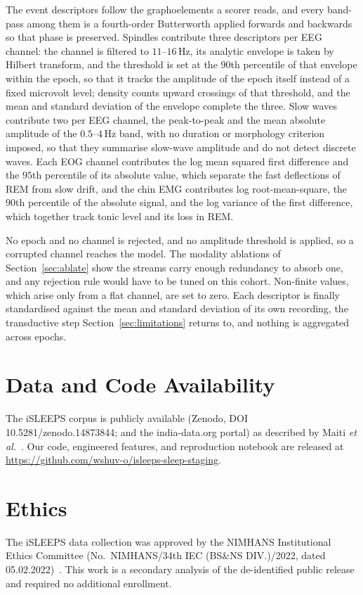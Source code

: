\documentclass{ieeeaccess}
\begin{document}
The event descriptors follow the graphoelements a scorer reads, and every band-pass
among them is a fourth-order Butterworth applied forwards and backwards so that
phase is preserved. Spindles contribute three descriptors per EEG channel: the
channel is filtered to $11$--$16$\,Hz, its analytic envelope is taken by Hilbert
transform, and the threshold is set at the $90$th percentile of that envelope within
the epoch, so that it tracks the amplitude of the epoch itself instead of a fixed
microvolt level; density counts upward crossings of that threshold, and the mean and
standard deviation of the envelope complete the three. Slow waves contribute two per
EEG channel, the peak-to-peak and the mean absolute amplitude of the $0.5$--$4$\,Hz
band, with no duration or morphology criterion imposed, so that they summarise
slow-wave amplitude and do not detect discrete waves. Each EOG channel contributes
the log mean squared first difference and the $95$th percentile of its absolute
value, which separate the fast deflections of REM from slow drift, and the chin EMG
contributes log root-mean-square, the $90$th percentile of the absolute signal, and
the log variance of the first difference, which together track tonic level and its
loss in REM.

No epoch and no channel is rejected, and no amplitude threshold is applied, so a
corrupted channel reaches the model. The modality ablations of
Section~\ref{sec:ablate} show the streams carry enough redundancy to absorb one, and
any rejection rule would have to be tuned on this cohort. Non-finite values, which
arise only from a flat channel, are set to zero. Each descriptor is finally
standardised against the mean and standard deviation of its own recording, the
transductive step Section~\ref{sec:limitations} returns to, and nothing is
aggregated across epochs.

\section*{Data and Code Availability}
The iSLEEPS corpus is publicly available (Zenodo, DOI 10.5281/zenodo.14873844; and the
india-data.org portal) as described by Maiti \textit{et al.}~\cite{maiti2026isleeps}. Our
code, engineered features, and reproduction notebook are released at
\url{https://github.com/wshuv-o/isleeps-sleep-staging}.

\section*{Ethics}
The iSLEEPS data collection was approved by the NIMHANS Institutional Ethics Committee
(No.\ NIMHANS/34th IEC (BS\&NS DIV.)/2022, dated 05.02.2022)~\cite{maiti2026isleeps}. This work
is a secondary analysis of the de-identified public release and required no additional
enrollment.
\end{document}
